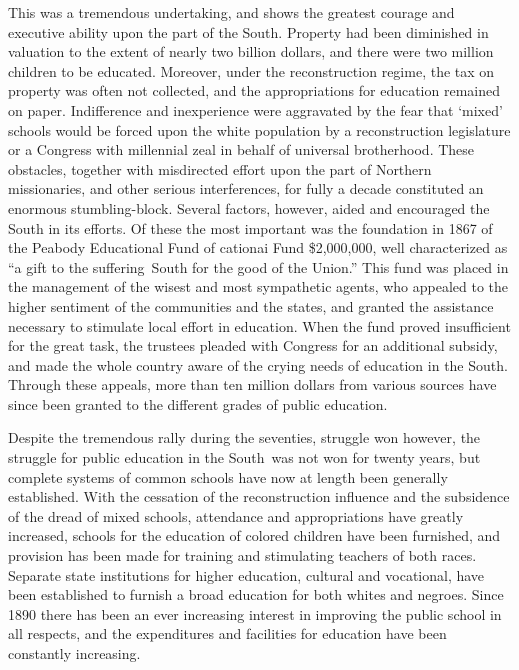 \documentclass[
]{book}
\begin{document}
This was a tremendous undertaking, and shows the greatest courage and executive ability upon the part of the South. Property had been diminished in valuation to the extent of nearly two billion dollars, and there were two million children to be educated. Moreover, under the reconstruction regime, the tax on property was often not collected, and the appropriations for education remained on paper. Indifference and inexperience were aggravated by the fear that `mixed' schools would be forced upon the white population by a reconstruction legislature or a Congress with millennial zeal in behalf of universal brotherhood. These obstacles, together with misdirected effort upon the part of Northern missionaries, and other serious interferences, for fully a decade constituted an enormous stumbling-block. Several factors, however, aided and encouraged the South in its efforts. Of these the most important was the foundation in 1867 of the Peabody Educational Fund of cationai Fund \$2,000,000, well characterized as ``a gift to the suffering~South for the good of the Union.'' This fund was placed in the management of the wisest and most sympathetic agents, who appealed to the higher sentiment of the communities and the states, and granted the assistance necessary to stimulate local effort in education. When the fund proved insufficient for the great task, the trustees pleaded with Congress for an additional subsidy, and made the whole country aware of the crying needs of education in the South. Through these appeals, more than ten million dollars from various sources have since been granted to the different grades of public education.

Despite the tremendous rally during the seventies, struggle won however, the struggle for public education in the South~was not won for twenty years, but complete systems of common schools have now at length been generally established. With the cessation of the reconstruction influence and the subsidence of the dread of mixed schools, attendance and appropriations have greatly increased, schools for the education of colored children have been furnished, and provision has been made for training and stimulating teachers of both races. Separate state institutions for higher education, cultural and vocational, have been established to furnish a broad education for both whites and negroes. Since 1890 there has been an ever increasing interest in improving the public school in all respects, and the expenditures and facilities for education have been constantly increasing.
\end{document}
